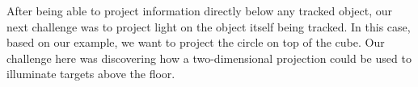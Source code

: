 After being able to project information directly below any tracked object, our next challenge was to project light on the object itself being tracked. 
In this case, based on our example, we want to project the circle on top of the cube. 
Our challenge here was discovering how a two-dimensional projection could be used to illuminate targets above the floor.


